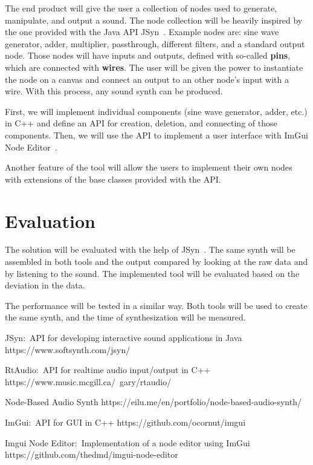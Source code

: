 \documentclass[conference]{IEEEtran}
\begin{document}
The end product will give the user a collection of nodes used to generate, manipulate, and output a sound. The node collection will be heavily inspired by the one provided with the Java API JSyn~\cite{jsyn}.
Example nodes are: sine wave generator, adder, multiplier, passthrough, different filters, and a standard output node.
Those nodes will have inputs and outputs, defined with so-called \textbf{pins}, which are connected with \textbf{wires}.
The user will be given the power to instantiate the node on a canvas and connect an output to an other node's input with a wire.
With this process, any sound synth can be produced.

First, we will implement individual components (sine wave generator, adder, etc.) in C++ and define an API for creation, deletion, and connecting of those components. Then, we will use the API to implement a user interface with ImGui Node Editor~\cite{imguinodeeditor}.

Another feature of the tool will allow the users to implement their own nodes with extensions of the base classes provided with the API.

\section{Evaluation}
The solution will be evaluated with the help of JSyn~\cite{jsyn}. The same synth will be assembled in both tools and the output compared by looking at the raw data and by listening to the sound. The implemented tool will be evaluated based on the deviation in the data.

The performance will be tested in a similar way. Both tools will be used to create the same synth, and the time of synthesization will be measured.

\begin{thebibliography}{1}
JSyn:~API for developing interactive sound applications in Java https://www.softsynth.com/jsyn/

RtAudio:~API for realtime audio input/output in C++ https://www.music.mcgill.ca/~gary/rtaudio/

Node-Based Audio Synth https://eilu.me/en/portfolio/node-based-audio-synth/

ImGui:~API for GUI in C++ https://github.com/ocornut/imgui

Imgui Node Editor:~Implementation of a node editor using ImGui https://github.com/thedmd/imgui-node-editor

\end{thebibliography}
\end{document}
